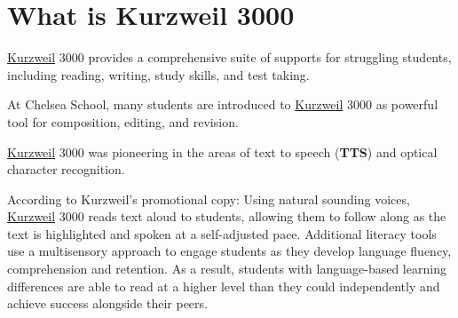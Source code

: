 \documentclass[letterpaper,10pt,english]{sphinxmanual}
\begin{document}
\section{What is Kurzweil 3000}
\label{kurzweil:what-is-kurzweil-3000}
\href{http://www.kurzweiledu.com/products/kurzweil-3000-firefly-overview.html}{Kurzweil} 3000 provides a comprehensive suite of supports for struggling students, including reading, writing, study skills, and test taking.

{\hfill{}\hfill}

At Chelsea School, many students are introduced to \href{http://www.kurzweiledu.com/products/kurzweil-3000-firefly-overview.html}{Kurzweil} 3000 as powerful tool for composition, editing, and revision.

\href{http://www.kurzweiledu.com/products/kurzweil-3000-firefly-overview.html}{Kurzweil} 3000 was pioneering in the areas of text to speech (\textbf{TTS}) and optical character recognition.

According to Kurzweil's promotional copy: Using natural sounding voices, \href{http://www.kurzweiledu.com/products/kurzweil-3000-firefly-overview.html}{Kurzweil} 3000 reads text aloud to students, allowing them to follow along as the text is highlighted and spoken at a self-adjusted pace. Additional literacy tools use a multisensory approach to engage students as they develop language fluency, comprehension and retention. As a result, students with language-based learning differences are able to read at a higher level than they could independently and achieve success alongside their peers.

{\hfill{}\hfill}
\end{document}
